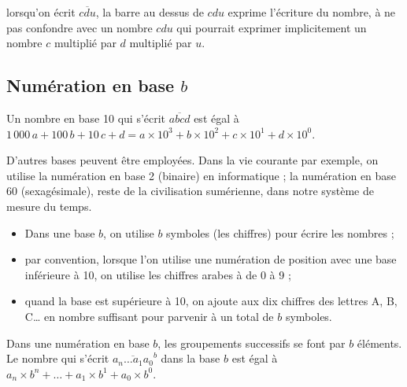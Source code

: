 \smallskip

\begin{remarque}
   lorsqu'on écrit $\overline{cdu}$, la \og barre \fg{} au dessus de $cdu$ exprime l'écriture du nombre, à ne pas confondre avec un nombre \og $cdu$ \fg{} qui pourrait exprimer implicitement un nombre $c$ multiplié par $d$ multiplié par $u$.
\end{remarque}


\subsection{Numération en base $b$} %

\smallskip

Un nombre en base 10 qui s'écrit $\overline{abcd}$ est égal à $1\,000\,a+100\,b+10\,c+d =a\times10^3+b\times10^2+c\times10^1+d\times10^0$.

D'autres bases peuvent être employées. Dans la vie courante par exemple, on utilise la numération en base 2 (binaire) en informatique ; la numération en base 60 (sexagésimale), reste de la civilisation sumérienne, dans notre système de mesure du temps. 

\begin{documentation}
\begin{itemize}
   \item Dans une base $b$, on utilise $b$ symboles (les chiffres) pour écrire les nombres ;
   \item par convention, lorsque l'on utilise une numération de position avec une base inférieure à 10, on utilise les chiffres arabes à de 0 à  9 ;
   \item quand la base est supérieure à 10, on ajoute aux dix chiffres des lettres A, B, C\dots{} en nombre suffisant pour parvenir à un total de $b$ symboles. \\ [-8mm]
\end{itemize}
\end{documentation}

\medskip

\begin{definition}
   Dans une numération en base $b$, les groupements successifs se font par $b$ éléments. \\
   Le nombre qui s'écrit $\overline{a_n\dots a_1a_0}^b$ dans la base $b$ est égal à $a_n\times b^n+\dots+a_1\times b^1+a_0\times b^0$.
\end{definition}
 
\bigskip
 
